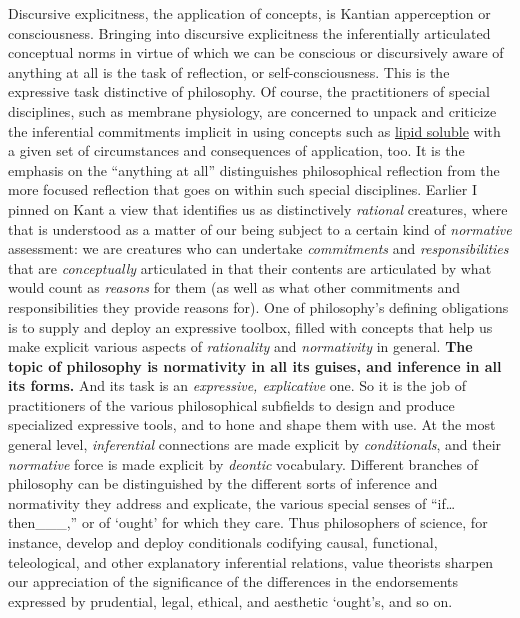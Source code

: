Discursive explicitness, the application of concepts, is Kantian
apperception or consciousness. Bringing into discursive explicitness the
inferentially articulated conceptual norms in virtue of which we can be
conscious or discursively aware of anything at all is the task of
reflection, or self-consciousness. This is the expressive task
distinctive of philosophy. Of course, the practitioners of special
disciplines, such as membrane physiology, are concerned to unpack and
criticize the inferential commitments implicit in using concepts such as
\underline{lipid soluble} with a given set of circumstances and
consequences of application, too. It is the emphasis on the ``anything
at all'' distinguishes philosophical reflection from the more focused
reflection that goes on within such special disciplines. Earlier I
pinned on Kant a view that identifies us as distinctively
\emph{rational} creatures, where that is understood as a matter of our
being subject to a certain kind of \emph{normative} assessment: we are
creatures who can undertake \emph{commitments} and
\emph{responsibilities} that are \emph{conceptually} articulated in that
their contents are articulated by what would count as \emph{reasons} for
them (as well as what other commitments and responsibilities they
provide reasons for). One of philosophy's defining obligations is to
supply and deploy an expressive toolbox, filled with concepts that help
us make explicit various aspects of \emph{rationality} and
\emph{normativity} in general. \textbf{The topic of philosophy is
normativity in all its guises, and inference in all its forms.} And its
task is an \emph{expressive, explicative} one. So it is the job of
practitioners of the various philosophical subfields to design and
produce specialized expressive tools, and to hone and shape them with
use. At the most general level, \emph{inferential} connections are made
explicit by \emph{conditionals}, and their \emph{normative} force is
made explicit by \emph{deontic} vocabulary. Different branches of
philosophy can be distinguished by the different sorts of inference and
normativity they address and explicate, the various special senses of
``if\ldots then\_\_\_,'' or of `ought' for which they care. Thus
philosophers of science, for instance, develop and deploy conditionals
codifying causal, functional, teleological, and other explanatory
inferential relations, value theorists sharpen our appreciation of the
significance of the differences in the endorsements expressed by
prudential, legal, ethical, and aesthetic `ought's, and so on.

